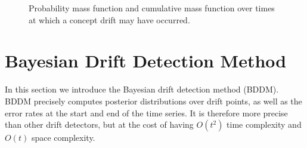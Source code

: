 \begin{figure}
    \centering
    \caption{Probability mass function and cumulative mass function over times at which a concept drift may have occurred.}
    \label{fig:bayes_pdf}
\end{figure}


\section{Bayesian Drift Detection Method} \label{BDD:bddm}

In this section we introduce the Bayesian drift detection method (BDDM). BDDM precisely computes posterior distributions over drift points, as well as the error rates at the start and end of the time series. It is therefore more precise than other drift detectors, but at the cost of having $O(t^2)$ time complexity and $O(t)$ space complexity. %

